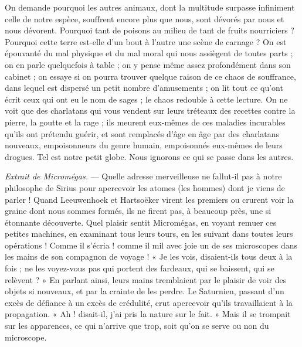 \documentclass[a4paper, 11pt, oneside]{article}
\begin{document}
On demande pourquoi les autres animaux, dont la multitude surpasse infiniment celle de notre espèce, souffrent encore plus que nous, sont dévorés par nous et nous dévorent. Pourquoi tant de poisons au milieu de tant de fruits nourriciers ? Pourquoi cette terre est-elle d'un bout à l'autre une scène de carnage ? On est épouvanté du mal physique et du mal moral qui nous assiègent de toutes parts ; on en parle quelquefois à table ; on y pense même assez profondément dans son cabinet ; on essaye si on pourra trouver quelque raison de ce chaos de souffrance, dans lequel est dispersé un petit nombre d'amusements ; on lit tout ce qu'ont écrit ceux qui ont eu le nom de sages ; le chaos redouble à cette lecture. On ne voit que des charlatans qui vous vendent sur leurs tréteaux des recettes contre la pierre, la goutte et la rage ; ils meurent eux-mêmes de ces maladies incurables qu'ils ont prétendu guérir, et sont remplacés d'âge en âge par des charlatans nouveaux, empoisonneurs du genre humain, empoisonnés eux-mêmes de leurs drogues. Tel est notre petit globe. Nous ignorons ce qui se passe dans les autres.

\emph{Extrait de Micromégas.} --- Quelle adresse merveilleuse ne fallut-il pas à notre philosophe de Sirius pour apercevoir les atomes (les hommes) dont je viens de parler ! Quand Leeuwenhoek et Hartsoëker virent les premiers ou crurent voir la graine dont nous sommes formés, ils ne firent pas, à beaucoup près, une si étonnante découverte. Quel plaisir sentit Micromégas, en voyant remuer ces petites machines, en examinant tous leurs tours, en les suivant dans toutes leurs opérations ! Comme il s'écria ! comme il mil avec joie un de ses microscopes dans les mains de son compagnon de voyage ! « Je les vois, disaient-ils tous deux à la fois ; ne les voyez-vous pas qui portent des fardeaux, qui se baissent, qui se relèvent ? » En parlant ainsi, leurs mains tremblaient par le plaisir de voir des objets si nouveaux, et par la crainte de les perdre. Le Saturnien, passant d'un excès de défiance à un excès de crédulité, crut apercevoir qu'ils travaillaient à la propagation. « Ah ! disait-il, j'ai pris la nature sur le fait. » Mais il se trompait sur les apparences, ce qui n'arrive que trop, soit qu'on se serve ou non du microscope.
\end{document}
